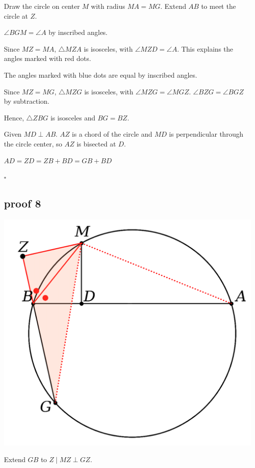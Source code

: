 \documentclass[11pt, oneside]{article}
\begin{document}
Draw the circle on center $M$ with radius $MA = MG$.  Extend $AB$ to meet the circle at $Z$.

$\angle BGM =  \angle  A$ by inscribed angles.

Since $MZ = MA$, $\triangle MZA$ is isosceles, with $\angle MZD =  \angle A$.  This explains the angles marked with red dots.

The angles marked with blue dots are equal by inscribed angles.

Since $MZ = MG$, $\triangle MZG$ is isosceles, with $\angle MZG =  \angle MGZ$.  $\angle BZG =  \angle BGZ$ by subtraction.

Hence, $\triangle ZBG$ is isosceles and $BG = BZ$.

Given $MD \perp AB$.  $AZ$ is a chord of the circle and $MD$ is perpendicular through the circle center, so $AZ$ is bisected at $D$.

$AD = ZD = ZB + BD = GB + BD$

$\square$

\subsection*{proof 8}

\begin{center} \includegraphics [scale=0.40] {bc8.png} \end{center}

Extend $GB$ to $Z \mid MZ \perp GZ$.
\end{document}
